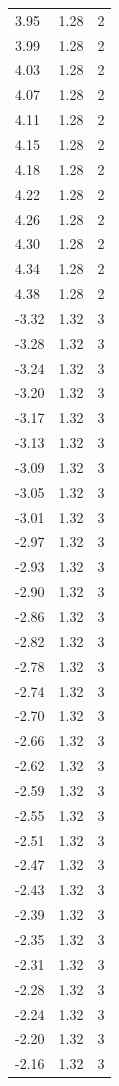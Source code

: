 \begin{longtable}{lrr}
  3.95 & 1.28 & 2 \\
  3.99 & 1.28 & 2 \\
  4.03 & 1.28 & 2 \\
  4.07 & 1.28 & 2 \\
  4.11 & 1.28 & 2 \\
  4.15 & 1.28 & 2 \\
  4.18 & 1.28 & 2 \\
  4.22 & 1.28 & 2 \\
  4.26 & 1.28 & 2 \\
  4.30 & 1.28 & 2 \\
  4.34 & 1.28 & 2 \\
  4.38 & 1.28 & 2 \\
  -3.32 & 1.32 & 3 \\
  -3.28 & 1.32 & 3 \\
  -3.24 & 1.32 & 3 \\
  -3.20 & 1.32 & 3 \\
  -3.17 & 1.32 & 3 \\
  -3.13 & 1.32 & 3 \\
  -3.09 & 1.32 & 3 \\
  -3.05 & 1.32 & 3 \\
  -3.01 & 1.32 & 3 \\
  -2.97 & 1.32 & 3 \\
  -2.93 & 1.32 & 3 \\
  -2.90 & 1.32 & 3 \\
  -2.86 & 1.32 & 3 \\
  -2.82 & 1.32 & 3 \\
  -2.78 & 1.32 & 3 \\
  -2.74 & 1.32 & 3 \\
  -2.70 & 1.32 & 3 \\
  -2.66 & 1.32 & 3 \\
  -2.62 & 1.32 & 3 \\
  -2.59 & 1.32 & 3 \\
  -2.55 & 1.32 & 3 \\
  -2.51 & 1.32 & 3 \\
  -2.47 & 1.32 & 3 \\
  -2.43 & 1.32 & 3 \\
  -2.39 & 1.32 & 3 \\
  -2.35 & 1.32 & 3 \\
  -2.31 & 1.32 & 3 \\
  -2.28 & 1.32 & 3 \\
  -2.24 & 1.32 & 3 \\
  -2.20 & 1.32 & 3 \\
  -2.16 & 1.32 & 3 \\

\end{longtable}
